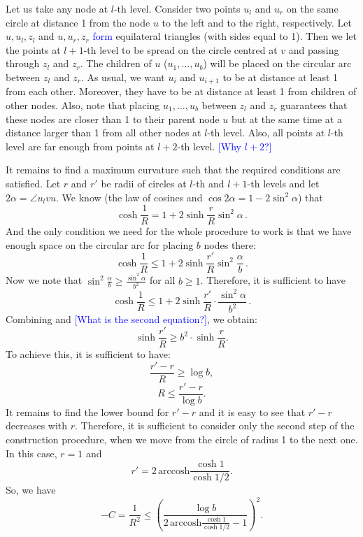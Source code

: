 \documentclass{article} %
\newcommand{\ph}[1]{\textcolor{blue}{#1}}
\begin{document}
Let us take any node at $l$-th level. Consider two points $u_l$ and $u_r$ on the same circle at distance 1 from the node $u$ to the left and to the right, respectively.
Let $u,u_l,z_l$ and $u,u_r,z_r$ \ph{form} equilateral triangles (with sides equal to 1). Then we let the points at $l+1$-th level to be spread on the circle centred at $v$ and passing through $z_l$ and $z_r$. The children of $u$ ($u_1, \ldots, u_{b}$) will be placed on the circular arc between $z_l$ and $z_r$. As usual, we want $u_i$ and $u_{i+1}$ to be at distance at least 1 from each other. Moreover, they have to be at distance at least 1 from children of other nodes. Also, note that placing $u_1, \ldots, u_{b}$ between $z_l$ and $z_r$ guarantees that these nodes are closer than 1 to their parent node $u$ but at the same time at a distance larger than 1 from all other nodes at $l$-th level. Also, all points at $l$-th level are far enough from points at $l+2$-th level. \ph{[Why $l+2$?]}

It remains to find a maximum curvature such that the required conditions are satisfied. Let $r$ and $r'$ be radii of circles at $l$-th and $l+1$-th levels and let $2\alpha = \angle u_l v u$. We know (the law of cosines and $\cos 2\alpha = 1 - 2\sin^2 \alpha$) that
\begin{equation}\label{eq:1}
\cosh \frac{1}{R} = 1 + 2 \sinh \frac{r}{R} \sin^2 \alpha \,.
\end{equation}
And the only condition we need for the whole procedure to work is that we have enough space on the circular arc for placing $b$ nodes there:
\[
\cosh \frac{1}{R} \le 1 + 2 \sinh \frac{r'}{R} \sin^2 \frac{\alpha}{b} \,.
\]
Now we note that $\sin^2 \frac{\alpha}{b} \ge \frac{\sin^2 \alpha}{b^2}$ for all $b \ge 1$. Therefore, it is sufficient to have
\begin{equation}\label{eq:2}
\cosh \frac{1}{R} \le 1 + 2 \sinh \frac{r'}{R} \cdot \frac{\sin^2 \alpha}{b^2} \,.
\end{equation}
Combining  and  \ph{[What is the second equation?]}, we obtain:
\[
\sinh \frac{r'}{R} \ge b^2 \cdot \sinh \frac{r}{R}.
\]
To achieve this, it is sufficient to have:
\[
\frac{r' - r}{R} \ge \log b,
\]
\[
R \le \frac{r' - r}{\log b}.
\]
It remains to find the lower bound for $r' - r$ and it is easy to see that $r' - r$ decreases with $r$. Therefore, it is sufficient to consider only the second step of the construction procedure, when we move from the circle of radius 1 to the next one. In this case, $r = 1$ and 
\[
r' = 2 \, \mathrm{arccosh} \frac{\cosh 1}{\cosh 1/2}.
\]
So, we have 
\[
-C = \frac{1}{R^2} \le \left( \frac{\log b}{2 \, \mathrm{arccosh} \frac{\cosh 1}{\cosh 1/2} - 1} \right)^2.
\]
\end{document}
